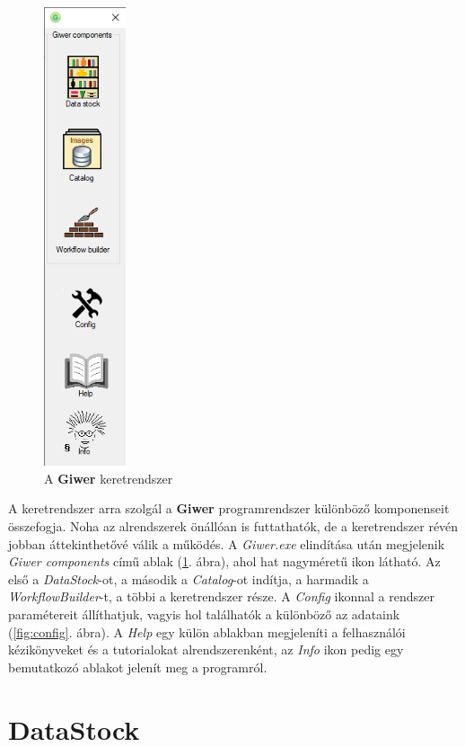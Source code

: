 \documentclass[a4paper,12pt]{article}
\begin{document}
\begin{figure}[h]
	\centering
	\includegraphics[height=13.5cm]{giwerMain.png}
	\caption{A \textbf{Giwer} keretrendszer}
	\label{fig:giwerStart}
\end{figure}

A keretrendszer arra szolgál a \textbf{Giwer} programrendszer különböző komponenseit összefogja. Noha az alrendszerek önállóan is futtathatók, de a keretrendszer révén jobban áttekinthetővé válik a működés. A \textit{Giwer.exe} elindítása után megjelenik \textit{Giwer components} című ablak (\ref{fig:giwerStart}. ábra), ahol hat nagyméretű ikon látható. Az első a \textit{DataStock}-ot, a második a \textit{Catalog}-ot indítja, a harmadik a  \textit{WorkflowBuilder}-t, a többi a keretrendszer része. A \textit{Config} ikonnal a rendszer paramétereit állíthatjuk, vagyis hol találhatók a különböző az adataink (\ref{fig:config}. ábra). A \textit{Help} egy külön ablakban megjeleníti a felhasználói kézikönyveket és a tutorialokat alrendszerenként, az \textit{Info} ikon pedig egy bemutatkozó ablakot jelenít meg a programról.




\section{DataStock}
\end{document}
